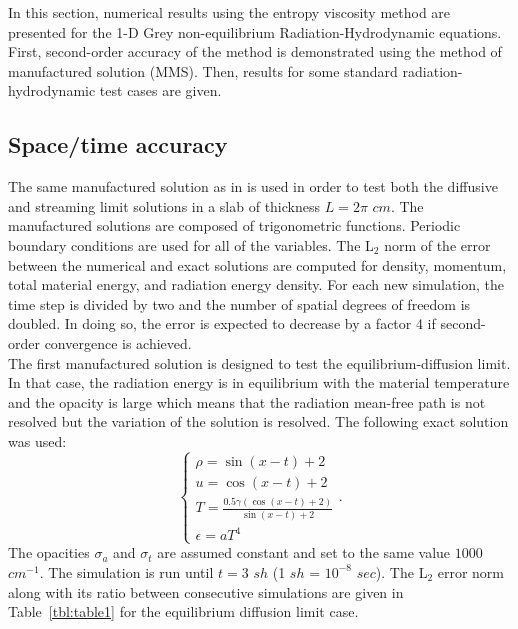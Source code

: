 \documentclass[review]{elsarticle}
\newcommand{\tbl}[1]{Table~\ref{#1}}                     %
\begin{document}
In this section, numerical results using the entropy viscosity method are presented for the 1-D Grey non-equilibrium Radiation-Hydrodynamic equations. First, second-order accuracy of the method is demonstrated using the method of manufactured solution (MMS). Then, results for some standard radiation-hydrodynamic test cases are given. 

\subsection{Space/time accuracy}
\label{sec:MMS}

The same manufactured solution as in \cite{EdwardsMorelLowrie} is used in order to test both the diffusive and streaming limit solutions in a slab of thickness $L=2 \pi$ $cm$. The manufactured solutions are composed of trigonometric functions. Periodic boundary conditions are used for all of the variables. The L$_2$ norm of the error between the numerical and exact solutions are computed for density, momentum, total material energy, and radiation energy density. For each new simulation, the time step is divided by two and the  number of spatial degrees of freedom is doubled. In doing so, the error is expected to decrease by a factor 4 if second-order convergence is achieved. \\
The first manufactured solution is designed to test the equilibrium-diffusion limit. In that case, the radiation energy is in equilibrium with the material temperature and the opacity is large which means that the radiation mean-free path is not resolved but the variation of the solution is resolved. The following exact solution was used:
\begin{equation}
\label{eq:equation13}
\left\{
\begin{array}{llll}
\rho = \sin (x-t)+2 \\
u = \cos(x-t) +2 \\
T = \frac{0.5 \gamma (\cos(x-t) +2) }{\sin (x-t)+2}\\
\epsilon = a T^4
\end{array}
\right. .
\end{equation}
The opacities $\sigma_a$ and $\sigma_t$ are assumed constant and set to the same value $1000$ $cm^{-1}$. The simulation is run until $t=3$ $sh$
(1 $sh$ = $10^{-8}$ $sec$). The L$_2$ error norm along with its ratio between consecutive simulations are given in \tbl{tbl:table1} for the equilibrium diffusion limit case.
\end{document}
